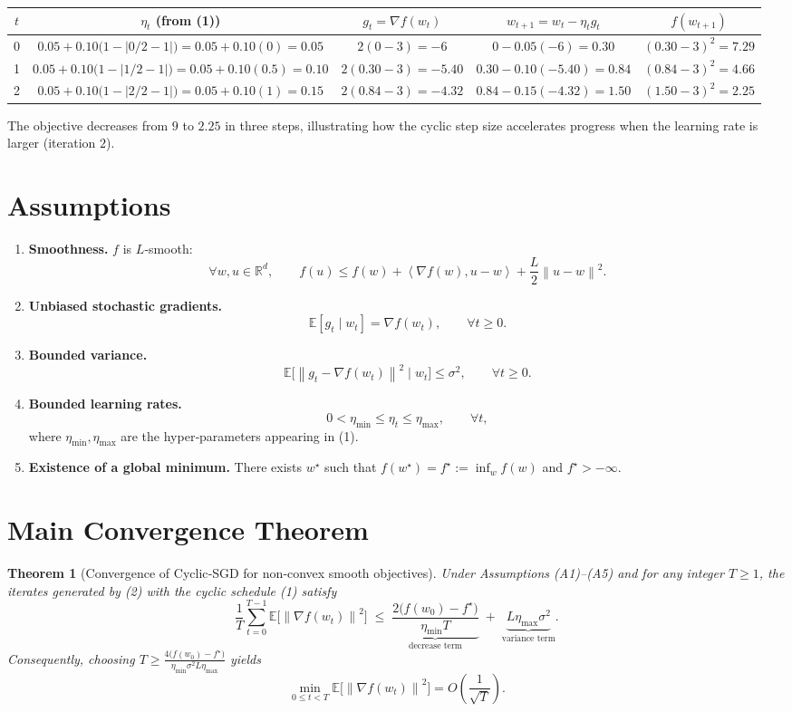 \documentclass{article}
\newtheorem{theorem}{Theorem}
\newcommand{\EE}{\mathbb{E}}
\newcommand{\RR}{\mathbb{R}}
\newcommand{\norm}[1]{\left\lVert #1 \right\rVert}
\newcommand{\inner}[2]{\left\langle #1,#2 \right\rangle}
\begin{document}
\begin{center}
\begin{tabular}{c|c|c|c|c}
$t$ & $\eta_t$ (from (1)) & $g_t=\nabla f(w_t)$ & $w_{t+1}=w_t-\eta_t g_t$ & $f(w_{t+1})$\\\hline
0 & $0.05+0.10\bigl(1-|0/2-1|\bigr)=0.05+0.10(0)=0.05$ & $2(0-3)=-6$ & $0-0.05(-6)=0.30$ & $(0.30-3)^2=7.29$\\[4pt]
1 & $0.05+0.10\bigl(1-|1/2-1|\bigr)=0.05+0.10(0.5)=0.10$ & $2(0.30-3)=-5.40$ & $0.30-0.10(-5.40)=0.84$ & $(0.84-3)^2=4.66$\\[4pt]
2 & $0.05+0.10\bigl(1-|2/2-1|\bigr)=0.05+0.10(1)=0.15$ & $2(0.84-3)=-4.32$ & $0.84-0.15(-4.32)=1.50$ & $(1.50-3)^2=2.25$\\
\end{tabular}
\end{center}
The objective decreases from $9$ to $2.25$ in three steps, illustrating how the cyclic step size accelerates progress when the learning rate is larger (iteration $2$).

\newpage
\section*{Assumptions}
\begin{enumerate}[label=(A\arabic*)]
\item \textbf{Smoothness.} $f$ is $L$‑smooth:
\[
\forall w,u\in\RR^{d},\qquad
f(u)\le f(w)+\inner{\nabla f(w)}{u-w}+\frac{L}{2}\norm{u-w}^{2}.
\tag{A1}
\]
\item \textbf{Unbiased stochastic gradients.}
\[
\EE[g_t\mid w_t]=\nabla f(w_t),\qquad\forall t\ge0.
\tag{A2}
\]
\item \textbf{Bounded variance.}
\[
\EE\bigl[\norm{g_t-\nabla f(w_t)}^{2}\mid w_t\bigr]\le\sigma^{2},\qquad\forall t\ge0.
\tag{A3}
\]
\item \textbf{Bounded learning rates.}
\[
0<\eta_{\min}\le\eta_t\le\eta_{\max},\qquad\forall t,
\tag{A4}
\]
where $\eta_{\min},\eta_{\max}$ are the hyper‑parameters appearing in (1).
\item \textbf{Existence of a global minimum.} There exists $w^{\star}$ such that $f(w^{\star})=f^{\star}:=\inf_{w}f(w)$ and $f^{\star}>-\infty$.
\end{enumerate}

\section*{Main Convergence Theorem}
\begin{theorem}[Convergence of Cyclic‑SGD for non‑convex smooth objectives]\label{thm:main}
Under Assumptions (A1)–(A5) and for any integer $T\ge1$, the iterates generated by (2) with the cyclic schedule (1) satisfy
\[
\frac{1}{T}\sum_{t=0}^{T-1}\EE\!\bigl[\norm{\nabla f(w_t)}^{2}\bigr]
\;\le\;
\underbrace{\frac{2\bigl(f(w_0)-f^{\star}\bigr)}{\eta_{\min}T}}_{\text{decrease term}}
\;+\;
\underbrace{L\eta_{\max}\sigma^{2}}_{\text{variance term}}.
\tag{3}
\]
Consequently, choosing $T\ge\frac{4\bigl(f(w_0)-f^{\star}\bigr)}{\eta_{\min}\sigma^{2}L\eta_{\max}}$ yields
\[
\min_{0\le t<T}\EE\!\bigl[\norm{\nabla f(w_t)}^{2}\bigr]=O\!\left(\frac{1}{\sqrt{T}}\right).
\]
\end{theorem}
\end{document}
